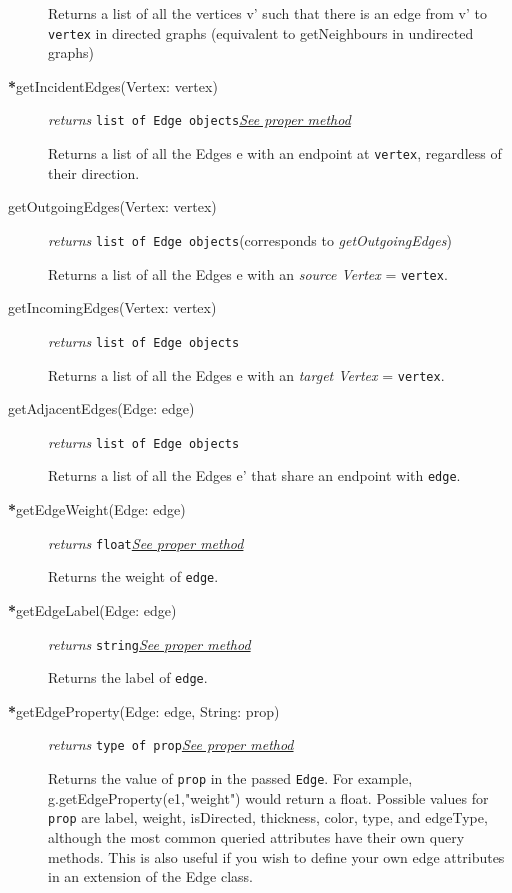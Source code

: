 \documentclass{article}
\newcounter{example}
\newlength\q
\begin{document}
\begin{description}
Returns a list of all the vertices v' such that there is an edge from v' to \texttt{vertex} in directed graphs (equivalent to getNeighbours in undirected graphs)

\item[\textbf{*}getIncidentEdges(Vertex: vertex)]\emph{returns} \texttt{list of Edge objects}\quad \hyperref[getIncidentEdgesClass]{\textit{See proper method}}


Returns a list of all the Edges e with an endpoint at \texttt{vertex}, regardless of their direction.

\label{getOutgoingEdgesClass}\item[getOutgoingEdges(Vertex: vertex)]\emph{returns} \texttt{list of Edge objects}\quad(corresponds to \textit{getOutgoingEdges})

Returns a list of all the Edges e with an \textit{source Vertex} = \texttt{vertex}.

\item[getIncomingEdges(Vertex: vertex)]\emph{returns} \texttt{list of Edge objects}

Returns a list of all the Edges e with an \textit{target Vertex} = \texttt{vertex}.

\item[getAdjacentEdges(Edge: edge)]\emph{returns}
  \texttt{list of Edge objects}

Returns a list of all the Edges e' that share an endpoint with \texttt{edge}.

\item[\textbf{*}getEdgeWeight(Edge: edge)]\emph{returns} \texttt{float}\quad \hyperref[getEdgeWeightClass]{\textit{See proper method}}

Returns the weight of \texttt{edge}.

\item[\textbf{*}getEdgeLabel(Edge: edge)]\emph{returns} \texttt{string}\quad \hyperref[getEdgeLabelClass]{\textit{See proper method}}

Returns the label of \texttt{edge}.

\item[\textbf{*}getEdgeProperty(Edge: edge, String: prop)]\emph{returns} \texttt{type of prop}\quad \hyperref[getEdgePropertyClass]{\textit{See proper method}}

Returns the value of \texttt{prop} in the passed \texttt{Edge}. For example, g.getEdgeProperty(e1,"weight") would return a float. Possible values for \texttt{prop} are label, weight, isDirected, thickness, color, type, and edgeType, although the most common queried attributes have their own query methods. This is also useful if you wish to define your own edge attributes in an extension of the Edge class.


\end{description}
\end{document}
